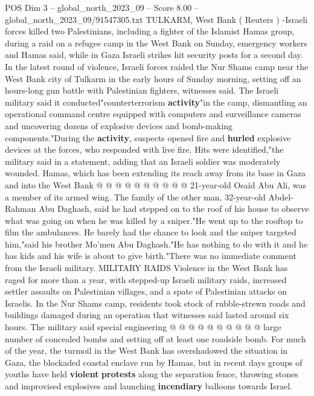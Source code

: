 \begin{textsample}{POS Dim 3 – global\_north\_2023\_09 – Score 8.00 – global\_north\_2023\_09/91547305.txt}  \label{ex:f3_pos_043}
TULKARM, West Bank ( Reuters ) -Israeli forces killed two Palestinians, including a fighter of the Islamist Hamas group, during a raid on a refugee camp in the West Bank on Sunday, emergency workers and Hamas said, while in Gaza Israeli strikes hit security posts for a second day.
In the latest round of violence, Israeli forces raided the Nur Shams camp near the West Bank city of Tulkarm in the early hours of Sunday morning, setting off an hours-long gun battle with Palestinian fighters, witnesses said.
The Israeli military said it conducted"counterterrorism \textbf{activity}"in the camp, dismantling an operational command centre equipped with computers and surveillance cameras and uncovering dozens of explosive devices and bomb-making components."During the \textbf{activity}, suspects opened fire and \textbf{hurled} explosive devices at the forces, who responded with live fire.
Hits were identified,"the military said in a statement, adding that an Israeli soldier was moderately wounded.
Hamas, which has been extending its reach away from its base in Gaza and into the West Bank @ @ @ @ @ @ @ @ @ @ 21-year-old Osaid Abu Ali, was a member of its armed wing.
The family of the other man, 32-year-old Abdel-Rahman Abu Daghash, said he had stepped on to the roof of his house to observe what was going on when he was killed by a sniper."He went up to the rooftop to film the ambulances.
He barely had the chance to look and the sniper targeted him,"said his brother Mo'men Abu Daghash."He has nothing to do with it and he has kids and his wife is about to give birth."There was no immediate comment from the Israeli military.
MILITARY RAIDS Violence in the West Bank has raged for more than a year, with stepped-up Israeli military raids, increased settler assaults on Palestinian villages, and a spate of Palestinian attacks on Israelis.
In the Nur Shams camp, residents took stock of rubble-strewn roads and buildings damaged during an operation that witnesses said lasted around six hours.
The military said special engineering @ @ @ @ @ @ @ @ @ @ large number of concealed bombs and setting off at least one roadside bomb.
For much of the year, the turmoil in the West Bank has overshadowed the situation in Gaza, the blockaded coastal enclave run by Hamas, but in recent days groups of youths have held \textbf{violent} \textbf{protests} along the separation fence, throwing stones and improvised explosives and launching \textbf{incendiary} balloons towards Israel.

\end{textsample}
